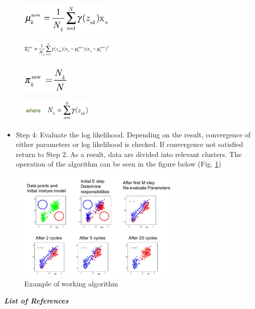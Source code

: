 \begin{figure}[H]
\centering{}\includegraphics[width=0.4\textwidth]{figures/Module_09/m09_22}
\end{figure}
\begin{figure}[H]
\centering{}\includegraphics[width=0.4\textwidth]{figures/Module_09/m09_23}
\end{figure}
\begin{figure}[H]
\centering{}\includegraphics[width=0.2\textwidth]{figures/Module_09/m09_24}
\end{figure}
\begin{figure}[H]
\centering{}\includegraphics[width=0.3\textwidth]{figures/Module_09/m09_25}
\end{figure}

\begin{itemize}
	\item Step 4: Evaluate the log likelihood. Depending on the result, convergence of either parameters or log likelihood is checked. If convergence not satisfied return to Step 2. As a result, data are divided into relevant clusters. The operation of the algorithm can be seen in the figure below (Fig. \ref{fig:figures/m09_19})
\end{itemize}

\begin{figure}[H]
\centering{}\includegraphics[width=0.7\textwidth]{figures/Module_09/m09_19}\caption{Example of working algorithm  \label{fig:figures/m09_19}}
\end{figure}

\textit{\textbf{List of References}}\\
\cite{09a1}